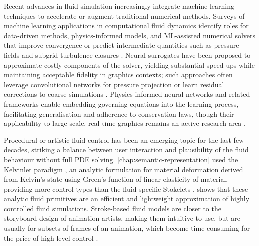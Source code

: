 Recent advances in fluid simulation increasingly integrate machine learning techniques to accelerate or augment traditional numerical methods. Surveys of machine learning applications in computational fluid dynamics identify roles for data-driven methods, physics-informed models, and ML-assisted numerical solvers that improve convergence or predict intermediate quantities such as pressure fields and subgrid turbulence closures \cite{Huang2022NN}. Neural surrogates have been proposed to approximate costly components of the solver, yielding substantial speed-ups while maintaining acceptable fidelity in graphics contexts; such approaches often leverage convolutional networks for pressure projection or learn residual corrections to coarse simulations \cite{Tompson2017,Sousa2024}. Physics-informed neural networks and related frameworks enable embedding governing equations into the learning process, facilitating generalisation and adherence to conservation laws, though their applicability to large-scale, real-time graphics remains an active research area \cite{Brunton2025}.


Procedural or artistic fluid control has been an emerging topic for the last few decades, striking a balance between user interaction and plausibility of the fluid behaviour without full PDE solving. \cref{chap:semantic-representation} used the Kelvinlet paradigm \cite{DeGoes2017}, an analytic formulation for material deformation derived from Kelvin's state using Green's function of linear elasticity of material, providing more control types than the fluid-specific Stokelets \cite{Chwang1976}. \cite{Wejchert1991} shows that these analytic fluid primitives are an efficient and lightweight approximation of highly controlled fluid simulations. Stroke-based fluid models are closer to the storyboard design of animation artists, making them intuitive to use, but are usually for subsets of frames of an animation, which become time-consuming for the price of high-level control \cite{Xing2016,Patel2005,Yan2020b,Pan2013}. 

